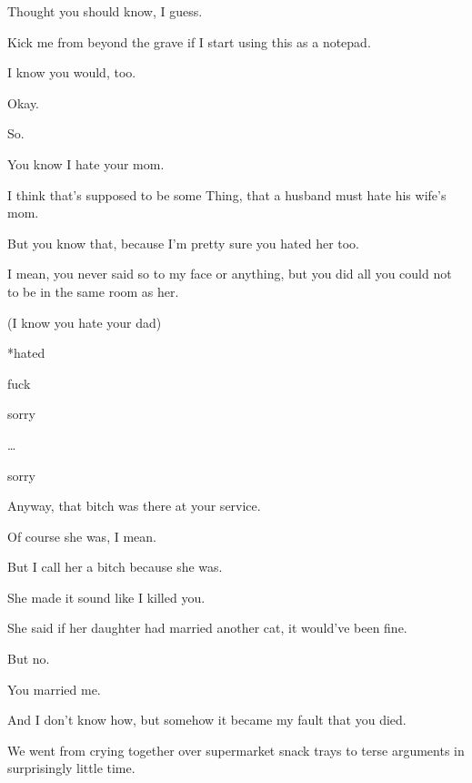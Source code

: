 { Thought you should know, I guess.

 Kick me from beyond the grave if I start using this as a notepad.

 I know you would, too.

\nopagebreak

 Okay.

 So.

 You know I hate your mom.

 I think that's supposed to be some Thing, that a husband must hate his wife's mom.

 But you know that, because I'm pretty sure you hated her too.

 I mean, you never said so to my face or anything, but you did all you could not to be in the same room as her.

(I know you hate your dad)

*hated

 fuck

 sorry

\ldots{}

 sorry

\nopagebreak

 Anyway, that bitch was there at your service.

 Of course she was, I mean.

 But I call her a bitch because she was.

 She made it sound like I killed you.

 She said if her daughter had married another cat, it would've been fine.

 But no.

 You married me.

 And I don't know how, but somehow it became my fault that you died.

 We went from crying together over supermarket snack trays to terse arguments in surprisingly little time.

}

